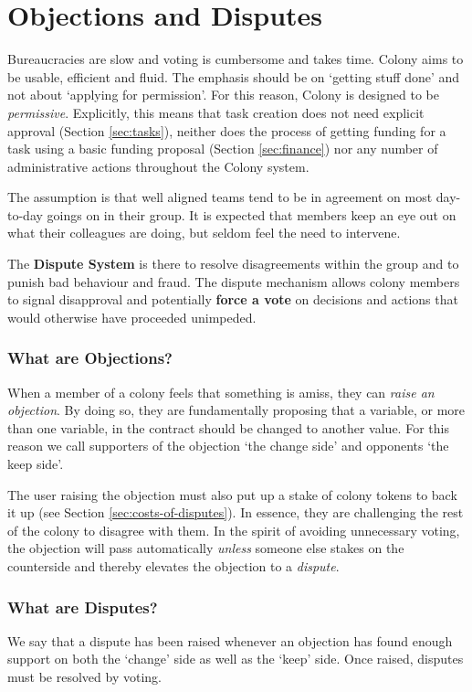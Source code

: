 \section{Objections and Disputes}\label{sec:objections-and-disputes}\label{sec:disputes}
Bureaucracies are slow and voting is cumbersome and takes time. Colony aims to be usable, efficient and fluid. The emphasis should be on `getting stuff done' and not about `applying for permission'. For this reason, Colony is designed to be \emph{permissive}. Explicitly, this means that task creation does not need explicit approval (Section \ref{sec:tasks}), neither does the process of getting funding for a task using a basic funding proposal (Section \ref{sec:finance}) nor any number of administrative actions throughout the Colony system.

The assumption is that well aligned teams tend to be in agreement on most day-to-day goings on in their group. It is expected that members keep an eye out on what their colleagues are doing, but seldom feel the need to intervene. 

The \textbf{Dispute System} is there to resolve disagreements within the group and to punish bad behaviour and fraud. The dispute mechanism allows colony members to signal disapproval and potentially \textbf{force a vote} on decisions and actions that would otherwise have proceeded unimpeded.


\subsubsection*{What are Objections?}
When a member of a colony feels that something is amiss, they can \emph{raise an objection}. By doing so, they are fundamentally proposing that a variable, or more than one variable, in the contract should be changed to another value. For this reason we call supporters of the objection `the change side' and opponents `the keep side'.

The user raising the objection must also put up a stake of colony tokens to back it up (see Section \ref{sec:costs-of-disputes}). In essence, they are challenging the rest of the colony to disagree with them. In the spirit of avoiding unnecessary voting, the objection will pass automatically \emph{unless} someone else stakes on the counterside and thereby elevates the objection to a \emph{dispute}.

\subsubsection*{What are Disputes?}
We say that a dispute has been raised whenever an objection has found enough support on both the `change' side as well as the `keep' side. Once raised, disputes must be resolved by voting. 


